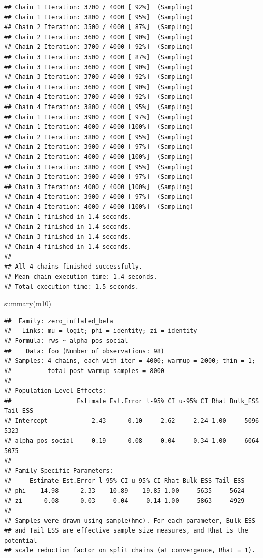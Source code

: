\documentclass[
]{article}
\newenvironment{Shaded}{\begin{snugshade}}{\end{snugshade}}
\newcommand{\FunctionTok}[1]{\textcolor[rgb]{0.00,0.00,0.00}{#1}}
\newcommand{\NormalTok}[1]{#1}
\begin{document}
\begin{verbatim}
## Chain 1 Iteration: 3700 / 4000 [ 92%]  (Sampling) 
## Chain 1 Iteration: 3800 / 4000 [ 95%]  (Sampling) 
## Chain 2 Iteration: 3500 / 4000 [ 87%]  (Sampling) 
## Chain 2 Iteration: 3600 / 4000 [ 90%]  (Sampling) 
## Chain 2 Iteration: 3700 / 4000 [ 92%]  (Sampling) 
## Chain 3 Iteration: 3500 / 4000 [ 87%]  (Sampling) 
## Chain 3 Iteration: 3600 / 4000 [ 90%]  (Sampling) 
## Chain 3 Iteration: 3700 / 4000 [ 92%]  (Sampling) 
## Chain 4 Iteration: 3600 / 4000 [ 90%]  (Sampling) 
## Chain 4 Iteration: 3700 / 4000 [ 92%]  (Sampling) 
## Chain 4 Iteration: 3800 / 4000 [ 95%]  (Sampling) 
## Chain 1 Iteration: 3900 / 4000 [ 97%]  (Sampling) 
## Chain 1 Iteration: 4000 / 4000 [100%]  (Sampling) 
## Chain 2 Iteration: 3800 / 4000 [ 95%]  (Sampling) 
## Chain 2 Iteration: 3900 / 4000 [ 97%]  (Sampling) 
## Chain 2 Iteration: 4000 / 4000 [100%]  (Sampling) 
## Chain 3 Iteration: 3800 / 4000 [ 95%]  (Sampling) 
## Chain 3 Iteration: 3900 / 4000 [ 97%]  (Sampling) 
## Chain 3 Iteration: 4000 / 4000 [100%]  (Sampling) 
## Chain 4 Iteration: 3900 / 4000 [ 97%]  (Sampling) 
## Chain 4 Iteration: 4000 / 4000 [100%]  (Sampling) 
## Chain 1 finished in 1.4 seconds.
## Chain 2 finished in 1.4 seconds.
## Chain 3 finished in 1.4 seconds.
## Chain 4 finished in 1.4 seconds.
## 
## All 4 chains finished successfully.
## Mean chain execution time: 1.4 seconds.
## Total execution time: 1.5 seconds.
\end{verbatim}

\begin{Shaded}
\begin{Highlighting}[]
\FunctionTok{summary}\NormalTok{(m10)}
\end{Highlighting}
\end{Shaded}

\begin{verbatim}
##  Family: zero_inflated_beta 
##   Links: mu = logit; phi = identity; zi = identity 
## Formula: rws ~ alpha_pos_social 
##    Data: foo (Number of observations: 98) 
## Samples: 4 chains, each with iter = 4000; warmup = 2000; thin = 1;
##          total post-warmup samples = 8000
## 
## Population-Level Effects: 
##                  Estimate Est.Error l-95% CI u-95% CI Rhat Bulk_ESS Tail_ESS
## Intercept           -2.43      0.10    -2.62    -2.24 1.00     5096     5323
## alpha_pos_social     0.19      0.08     0.04     0.34 1.00     6064     5075
## 
## Family Specific Parameters: 
##     Estimate Est.Error l-95% CI u-95% CI Rhat Bulk_ESS Tail_ESS
## phi    14.98      2.33    10.89    19.85 1.00     5635     5624
## zi      0.08      0.03     0.04     0.14 1.00     5863     4929
## 
## Samples were drawn using sample(hmc). For each parameter, Bulk_ESS
## and Tail_ESS are effective sample size measures, and Rhat is the potential
## scale reduction factor on split chains (at convergence, Rhat = 1).
\end{verbatim}
\end{document}

